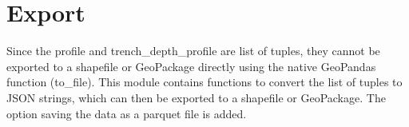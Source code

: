 \documentclass[letterpaper,10pt,english]{sphinxmanual}
\begin{document}

\begin{fulllineitems}
\label{\detokenize{pysewer:pysewer.config.settings.view_default_settings}}
\pysigstartsignatures
{}
\pysigstopsignatures
\end{fulllineitems}



\section{Export}
\label{\detokenize{pysewer:module-pysewer.export}}\label{\detokenize{pysewer:export}}
\sphinxAtStartPar
Since the profile and trench\_depth\_profile are list of tuples, they cannot be exported
to a shapefile or GeoPackage directly using the native GeoPandas function (to\_file).
This module contains functions to convert the list of tuples to JSON strings,
which can then be exported to a shapefile or GeoPackage.
The option saving the data as a parquet file is added.
\end{document}
